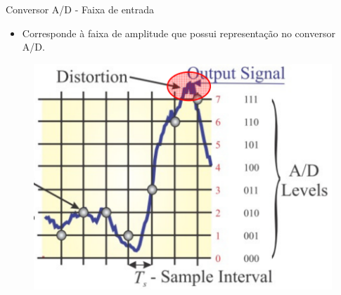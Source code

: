 \documentclass[aspectratio=169,
				xcolor=table]{beamer}
\begin{document}
	\begin{frame}{Conversor A/D - Faixa de entrada}
		\begin{itemize}
			\item Corresponde à faixa de amplitude que possui representação no conversor A/D.
		\end{itemize}
		\begin{figure}[hbtp]
			\centering
			\includegraphics[height=.65\textheight, keepaspectratio]{../figs/cap01/ad04.png}
		\end{figure}
	\end{frame}
	
\end{document}
